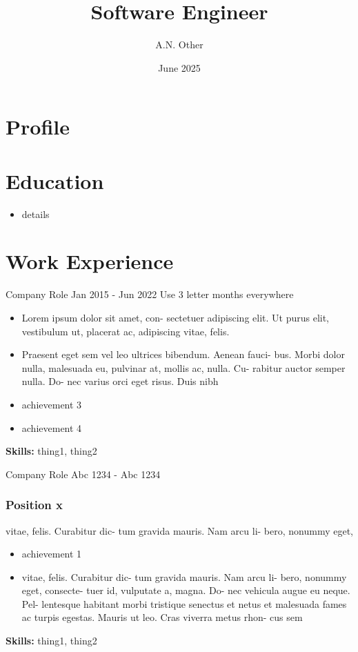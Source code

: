 \documentclass[9pt]{smart-cv}
\author{A.N. Other}
\title{Software Engineer}
\date{June 2025}
\begin{document}
  \begin{two-col}
    {
      \section*{Profile}

      \lipsum[1]

      \section{Education}

      \begin{itemize}
        \item details
      \end{itemize}
    }

    \section{Work Experience}

    \begin{job}
      {Company}
      {Role}
      {Jan 2015 - Jun 2022}
      Use 3 letter months everywhere
      \begin{itemize}
        \item Lorem ipsum dolor sit amet, con- sectetuer adipiscing elit. Ut
          purus elit, vestibulum ut, placerat ac, adipiscing vitae, felis.
        \item Praesent eget sem vel leo ultrices bibendum. Aenean fauci- bus.
          Morbi dolor nulla, malesuada eu, pulvinar at, mollis ac, nulla. Cu-
          rabitur auctor semper nulla. Do- nec varius orci eget risus. Duis
          nibh
        \item achievement 3
        \item achievement 4
      \end{itemize}
      \textbf{Skills:} thing1, thing2
    \end{job}

    \begin{job}
      {Company}
      {Role}
      {Abc 1234 - Abc 1234}

      \subsubsection{Position x} vitae, felis. Curabitur dic- tum gravida
      mauris. Nam arcu li- bero, nonummy eget,
      \begin{itemize}
        \item achievement 1
        \item vitae, felis. Curabitur dic- tum gravida mauris. Nam arcu li-
          bero, nonummy eget, consecte- tuer id, vulputate a, magna. Do- nec
          vehicula augue eu neque. Pel- lentesque habitant morbi tristique
          senectus et netus et malesuada fames ac turpis egestas. Mauris ut
          leo. Cras viverra metus rhon- cus sem
      \end{itemize}
      \textbf{Skills:} thing1, thing2
    \end{job}


\end{two-col}
\end{document}
